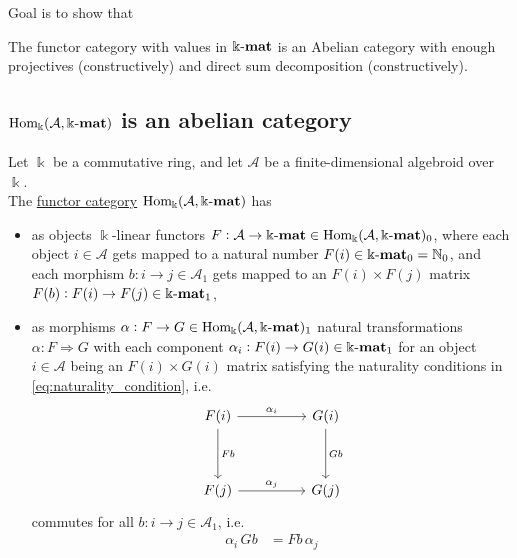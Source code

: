 \label{sect:abelian_cat}
Goal is to show that

The functor category with values in $\Bbbk\textnormal{-}\mathbf{mat}$ is an Abelian category with enough projectives (constructively) and direct sum decomposition (constructively).

\subsection{$\mathrm{Hom_{\Bbbk}}(\mathcal{A},\Bbbk\textnormal{-}\mathbf{mat})$ is an abelian category}

\begin{definition}
Let $\Bbbk$ be a commutative ring, and let $\mathcal{A}$ be a finite-dimensional algebroid over $\Bbbk$.\\
The \ul{functor category} $\mathrm{Hom_{\Bbbk}}(\mathcal{A},\Bbbk\textnormal{-}\mathbf{mat})$ has
\begin{itemize}
\item as objects $\Bbbk$-linear functors $F : \mathcal{A} \rightarrow \Bbbk\textnormal{-}\mathbf{mat} \in \mathrm{Hom_{\Bbbk}}(\mathcal{A},\Bbbk\textnormal{-}\mathbf{mat})_{0}$, where each
object $i \in \mathcal{A}$ gets mapped to a natural number $F(i) \in \Bbbk\textnormal{-}\mathbf{mat}_{0} = \mathbb{N}_{0}$, and each
morphism $b : i \rightarrow j \in \mathcal{A}_{1}$ gets mapped to an $F(i) \times F(j)$ matrix
$F(b) : F(i) \rightarrow F(j) \in \Bbbk\textnormal{-}\mathbf{mat}_{1}$,
\item as morphisms $\alpha : F \rightarrow G \in \mathrm{Hom_{\Bbbk}}(\mathcal{A},\Bbbk\textnormal{-}\mathbf{mat})_{1}$ natural transformations $\alpha : F \Rightarrow G$ with each component
$\alpha_{i} : F(i) \rightarrow G(i) \in \Bbbk\textnormal{-}\mathbf{mat}_{1}$ for an object $i \in \mathcal{A}$ being an $F(i) \times G(i)$ matrix satisfying the
naturality conditions in \eqref{eq:naturality_condition}, i.e.
\[
\begin{tikzcd}
F(i) \arrow[rr, "\alpha_{i}"] \arrow[dd, "Fb"] &  & G(i) \arrow[dd, "Gb"] \\
                                             &  &                     \\
F(j) \arrow[rr, "\alpha_{j}"]                &  & G(j)                
\end{tikzcd}
\]
commutes for all $b : i \rightarrow j \in \mathcal{A}_{1}$, i.e.
\begin{align}
\alpha_{i}\,Gb &= Fb\,\alpha_{j}
\end{align}
\end{itemize}
\end{definition}

